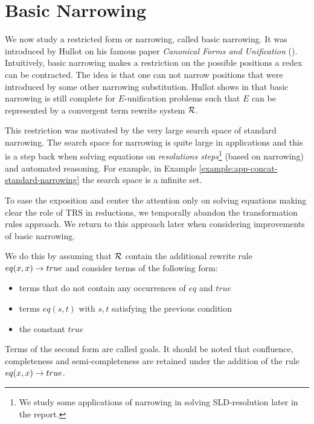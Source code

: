 \section{Basic Narrowing}
We now study a restricted form or narrowing, called basic narrowing. It was introduced by Hullot on his famous paper \textit{Canonical Forms and Unification} (\cite{hullot:cfunif}). Intuitively, basic narrowing makes a restriction on the possible positions a redex can be contracted. The idea is that one can not narrow positions that were introduced by some other narrowing substitution. Hullot shows in \cite{hullot:cfunif} that basic narrowing is still complete for $E$-unification problems such that $E$ can be represented by a convergent term rewrite system $\mathcal{R}$.

This restriction was motivated by the very large search space of standard narrowing. The search space for narrowing is quite large in applications and this is a step back when solving equations on \textit{resolutions steps}\footnote{We study some applications of narrowing in solving SLD-resolution later in the report.} (based on narrowing) and automated reasoning. For example, in Example \ref{example:app-concat-standard-narrowing} the search space is a infinite set.

To ease the exposition and center the attention only on solving equations making clear the role of TRS in reductions, we temporally abandon the transformation rules approach. We return to this approach later when considering improvements of basic narrowing.

We do this by assuming that $\mathcal{R}$ contain the additional rewrite rule $eq(x,x) \rightarrow true$ and consider terms of the following form:
\begin{itemize}
	\item terms that do not contain any occurrences of $eq$ and $true$
	\item terms $eq(s,t)$ with $s,t$ satisfying the previous condition
	\item the constant $true$
\end{itemize}
Terms of the second form are called goals. It should be noted that confluence, completeness and semi-completeness are retained under the addition of the rule $eq(x,x) \rightarrow true$.

